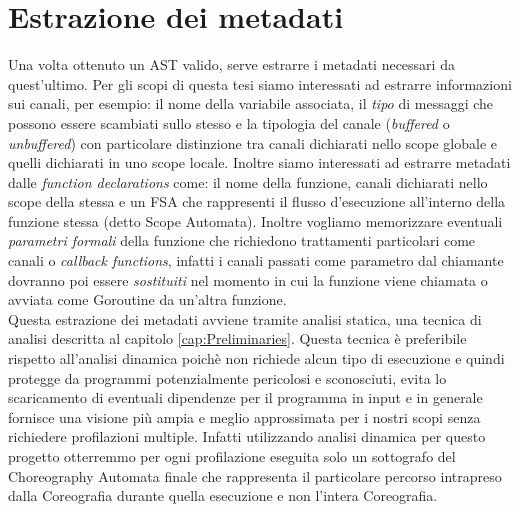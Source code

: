 \section{Estrazione dei metadati}
Una volta ottenuto un AST valido, serve estrarre i metadati necessari da quest'ultimo. Per gli scopi di questa tesi siamo interessati ad estrarre informazioni sui canali, per esempio: il nome della variabile associata, il \emph{tipo} di messaggi che possono essere scambiati sullo stesso e la tipologia del canale (\emph{buffered} o \emph{unbuffered}) con particolare distinzione tra canali dichiarati nello scope globale e quelli dichiarati in uno scope locale. Inoltre siamo interessati ad estrarre metadati dalle \emph{function declarations} come: il nome della funzione, canali dichiarati nello scope della stessa e un FSA che rappresenti il flusso d'esecuzione all'interno della funzione stessa (detto Scope Automata). Inoltre vogliamo memorizzare eventuali \emph{parametri formali} della funzione che richiedono trattamenti particolari come canali o \emph{callback functions}, infatti i canali passati come parametro dal chiamante dovranno poi essere \emph{sostituiti} nel momento in cui la funzione viene chiamata o avviata come Goroutine da un'altra funzione. \bigskip \\
Questa estrazione dei metadati avviene tramite analisi statica, una tecnica di analisi descritta al capitolo \ref{cap:Preliminaries}. Questa tecnica è preferibile rispetto all'analisi dinamica poichè non richiede alcun tipo di esecuzione e quindi protegge da programmi potenzialmente pericolosi e sconosciuti, evita lo scaricamento di eventuali dipendenze per il programma in input e in generale fornisce una visione più ampia e meglio approssimata per i nostri scopi senza richiedere profilazioni multiple. Infatti utilizzando analisi dinamica per questo progetto otterremmo per ogni profilazione eseguita solo un sottografo del Choreography Automata finale che rappresenta il particolare percorso intrapreso dalla Coreografia durante quella esecuzione e non l'intera Coreografia.

